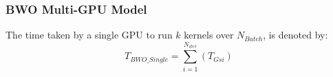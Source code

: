 \documentclass[conference]{IEEEtran}
\theoremstyle{definition}
\begin{document}
% 
% 

\subsubsection{BWO Multi-GPU Model}

\par
The time taken by a single GPU to run $k$ kernels over $N_{Batch}$, is denoted by: 
{\scriptsize
\begin{equation}
T_{BWO\_Single} = \sum_{i=1}^{N_{iter}}(T_{Gsi})
\end{equation}
}%


\par
\end{document}
